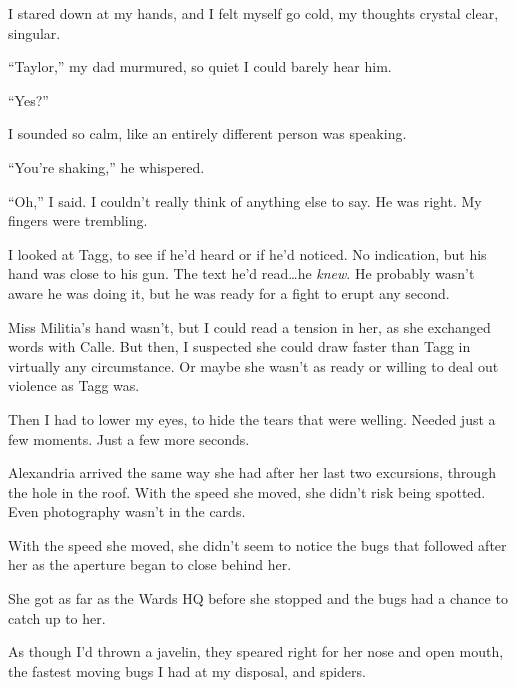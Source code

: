 I stared down at my hands, and I felt myself go cold, my thoughts crystal clear, singular.



``Taylor,'' my dad murmured, so quiet I could barely hear him.



``Yes?''



I sounded so calm, like an entirely different person was speaking.



``You're shaking,'' he whispered.



``Oh,'' I said.  I couldn't really think of anything else to say.  He was right.  My fingers were trembling.



I looked at Tagg, to see if he'd heard or if he'd noticed.  No indication, but his hand was close to his gun.  The text he'd read\ldots he \emph{knew}.  He probably wasn't aware he was doing it, but he was ready for a fight to erupt any second.



Miss Militia's hand wasn't, but I could read a tension in her, as she exchanged words with Calle.  But then, I suspected she could draw faster than Tagg in virtually any circumstance.  Or maybe she wasn't as ready or willing to deal out violence as Tagg was.



Then I had to lower my eyes, to hide the tears that were welling.  Needed just a few moments.  Just a few more seconds.



Alexandria arrived the same way she had after her last two excursions, through the hole in the roof.  With the speed she moved, she didn't risk being spotted.  Even photography wasn't in the cards.



With the speed she moved, she didn't seem to notice the bugs that followed after her as the aperture began to close behind her.



She got as far as the Wards HQ before she stopped and the bugs had a chance to catch up to her.



As though I'd thrown a javelin, they speared right for her nose and open mouth, the fastest moving bugs I had at my disposal, and spiders.



